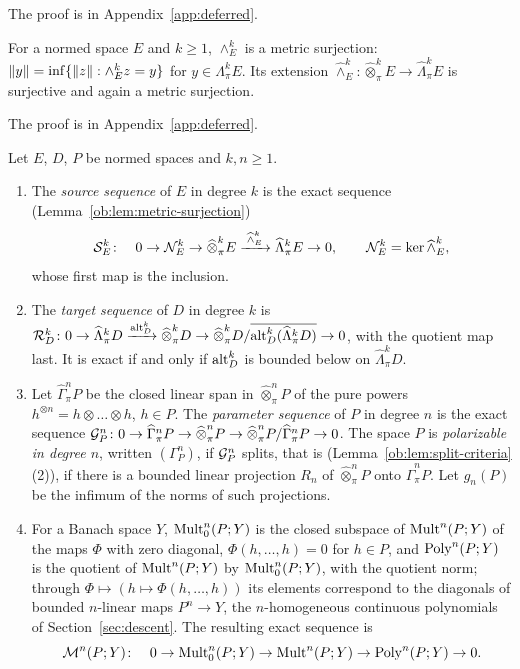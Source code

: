 The proof is in Appendix~\ref{app:deferred}.

\begin{lemma}\label{ob:lem:metric-surjection}
For a normed space $E$ and $k\ge1$, $\wedge^k_E$ is a metric surjection: $\lVert y\rVert=\inf\{\lVert z\rVert:\wedge^k_Ez=y\}$ for
$y\in\Lambda^k_\pi E$. Its extension $\widehat\wedge^k_E\colon\widehat\otimes^k_\pi E\to\widehat\Lambda^k_\pi E$ is
surjective and again a metric surjection.
\end{lemma}

The proof is in Appendix~\ref{app:deferred}.

\begin{definition}\label{ob:def:sequences}
Let $E$, $D$, $P$ be normed spaces and $k,n\ge1$.
\begin{enumerate}
\item The \emph{source sequence} of $E$ in degree $k$ is the exact sequence (Lemma~\ref{ob:lem:metric-surjection})
\begin{equation}\label{ob:eq:source}
 \mathcal S^k_E\colon\quad0\to\mathcal N^k_E\to\widehat\otimes^k_\pi E\xrightarrow{\;\widehat\wedge^k_E\;}\widehat\Lambda^k_\pi E\to0,
 \qquad \mathcal N^k_E=\ker\widehat\wedge^k_E,
\end{equation}
whose first map is the inclusion.
\item The \emph{target sequence} of $D$ in degree $k$ is
$\mathcal R^k_D\colon0\to\widehat\Lambda^k_\pi D\xrightarrow{\operatorname{alt}^k_D}\widehat\otimes^k_\pi D\to
\widehat\otimes^k_\pi D/\overline{\operatorname{alt}^k_D(\widehat\Lambda^k_\pi D)}\to0$, with the quotient map last. It is exact if and
only if $\operatorname{alt}^k_D$ is bounded below on $\widehat\Lambda^k_\pi D$.
\item Let $\widehat\Gamma^n_\pi P$ be the closed linear span in $\widehat\otimes^n_\pi P$ of the pure powers
$h^{\otimes n}=h\otimes\dots\otimes h$, $h\in P$. The \emph{parameter sequence} of $P$ in degree $n$ is the exact sequence
$\mathcal G^n_P\colon0\to\widehat\Gamma^n_\pi P\to\widehat\otimes^n_\pi P\to\widehat\otimes^n_\pi P/\widehat\Gamma^n_\pi P\to0$.
The space $P$ is \emph{polarizable in degree $n$}, written $(\Gamma^n_P)$, if $\mathcal G^n_P$ splits, that is
(Lemma~\ref{ob:lem:split-criteria}(2)), if there is a bounded linear projection $R_n$ of $\widehat\otimes^n_\pi P$ onto
$\widehat\Gamma^n_\pi P$. Let $g_n(P)$ be the infimum of the norms of such projections.
\item For a Banach space $Y$, $\operatorname{Mult}^n_0(P;Y)$ is the closed subspace of $\operatorname{Mult}^n(P;Y)$ of the maps $\Phi$ with zero
diagonal, $\Phi(h,\dots,h)=0$ for $h\in P$, and $\operatorname{Poly}^n(P;Y)$ is the quotient of $\operatorname{Mult}^n(P;Y)$ by $\operatorname{Mult}^n_0(P;Y)$,
with the quotient norm; through $\Phi\mapsto(h\mapsto\Phi(h,\dots,h))$ its elements correspond to the diagonals of bounded
$n$-linear maps $P^n\to Y$, the $n$-homogeneous continuous polynomials of Section~\ref{sec:descent}. The resulting exact sequence is
\[
 \mathcal M^n(P;Y)\colon\quad0\to\operatorname{Mult}^n_0(P;Y)\to\operatorname{Mult}^n(P;Y)\to\operatorname{Poly}^n(P;Y)\to0.
\]
\end{enumerate}
\end{definition}

